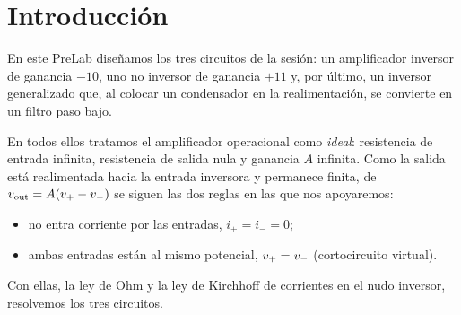 \section{Introducción}\label{sec:introduccion}
En este PreLab diseñamos los tres circuitos de la sesión: un amplificador inversor de ganancia $-10$, uno
no inversor de ganancia $+11$ y, por último, un inversor generalizado que, al colocar un condensador en
la realimentación, se convierte en un filtro paso bajo.

En todos ellos tratamos el amplificador operacional como \emph{ideal}: resistencia de entrada infinita,
resistencia de salida nula y ganancia $A$ infinita. Como la salida está realimentada hacia la entrada
inversora y permanece finita, de $v_{\mathrm{out}}=A(v_{+}-v_{-})$ se siguen las dos reglas en las que nos apoyaremos:
\begin{itemize}[leftmargin=3em]
  \item[(R1)] no entra corriente por las entradas, $i_+=i_-=0$;
  \item[(R2)] ambas entradas están al mismo potencial, $v_{+}=v_{-}$ (cortocircuito virtual).
\end{itemize}
Con ellas, la ley de Ohm y la ley de Kirchhoff de corrientes en el nudo inversor, resolvemos los tres
circuitos.
